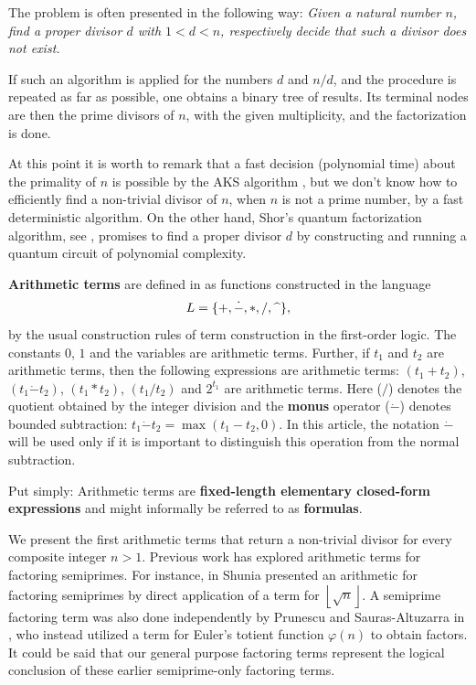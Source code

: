 \documentclass[10pt]{article}
\theoremstyle{plain}
\newcommand{\floor}[1]{\left\lfloor #1 \right\rfloor}
\begin{document}
The problem is often presented in the following way: \textit{Given a natural number $n$, find a proper divisor $d$ with $1 < d < n$, respectively decide that such a divisor does not exist.}

If such an algorithm is applied for the numbers $d$ and $n/d$, and the procedure is repeated  as far as possible, one obtains a binary tree of results. Its terminal nodes are then the prime divisors of $n$, with the given multiplicity, and the factorization is done.

At this point it is worth to remark that a fast decision (polynomial time) about the primality of $n$ is possible by the AKS algorithm \cite{AKS, AKSErrata, granvilleprimes}, but we don't know how to efficiently find a non-trivial divisor of $n$, when $n$ is not a prime number, by a fast deterministic algorithm. On the other hand, Shor's quantum factorization algorithm, see \cite{shor}, promises to find a proper divisor $d$ by constructing and running a quantum circuit of polynomial complexity.

\textbf{Arithmetic terms} are defined in \cite{prunescu2024factorial, prunescu2024numbertheoreticfunctions} as functions  constructed in the language
\begin{align*}
L = \{ +, \dot{-}, \ast, /, \textup{\textasciicircum} \} ,
\end{align*}
by the usual construction rules of term construction in the first-order logic. The constants $0$, $1$ and the variables are arithmetic terms. Further, if $t_1$ and $t_2$ are arithmetic terms, then the following expressions are arithmetic terms: $(t_1 + t_2)$, $(t_1 \dot{-} t_2)$, $(t_1 \ast t_2)$, $(t_1 / t_2)$ and $2^{t_1}$ are arithmetic terms.
Here ($/$) denotes the quotient obtained by the integer division and the \textbf{monus} operator ($\dot{-}$) denotes bounded subtraction: $t_1 \dot{-} t_2 = \max(t_1 - t_2, 0)$. In this article, the notation $\dot{-}$ will be used only if it is important to distinguish this operation from the normal subtraction.

Put simply: Arithmetic terms are \textbf{fixed-length elementary closed-form expressions} and might informally be referred to as \textbf{formulas}.

We present the first arithmetic terms that return a non-trivial divisor for every composite integer $n > 1$. Previous work has explored arithmetic terms for factoring semiprimes. For instance, in \cite{shunia2024elementary} Shunia presented an arithmetic for factoring semiprimes by direct application of a term for $\floor{\sqrt{n}}$. A semiprime factoring term was also done independently by Prunescu and Sauras-Altuzarra in \cite{prunescu2024numbertheoreticfunctions}, who instead utilized a term for Euler's totient function $\varphi(n)$ to obtain factors. It could be said that our general purpose factoring terms represent the logical conclusion of these earlier semiprime-only factoring terms.
\end{document}
